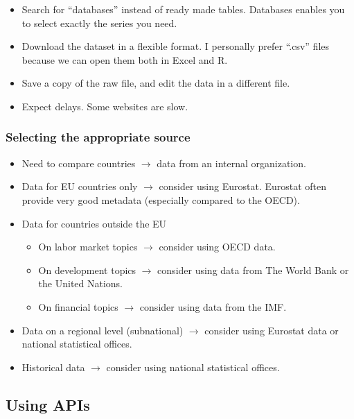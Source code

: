 \documentclass[]{book}
\providecommand{\tightlist}{%
  \setlength{\itemsep}{0pt}\setlength{\parskip}{0pt}}
\begin{document}
\begin{itemize}
\tightlist
\item
  Search for ``databases'' instead of ready made tables. Databases enables you to select exactly the series you need.
\item
  Download the dataset in a flexible format. I personally prefer ``.csv'' files because we can open them both in Excel and R.
\item
  Save a copy of the raw file, and edit the data in a different file.
\item
  Expect delays. Some websites are slow.
\end{itemize}

\hypertarget{selecting-the-appropriate-source}{%
\subsubsection{Selecting the appropriate source}\label{selecting-the-appropriate-source}}

\begin{itemize}
\item
  Need to compare countries \(\rightarrow\) data from an internal organization.
\item
  Data for EU countries only \(\rightarrow\) consider using Eurostat. Eurostat often provide very good metadata (especially compared to the OECD).
\item
  Data for countries outside the EU

  \begin{itemize}
  \tightlist
  \item
    On labor market topics \(\rightarrow\) consider using OECD data.
  \item
    On development topics \(\rightarrow\) consider using data from The World Bank or the United Nations.
  \item
    On financial topics \(\rightarrow\) consider using data from the IMF.
  \end{itemize}
\item
  Data on a regional level (subnational) \(\rightarrow\) consider using Eurostat data or national statistical offices.
\item
  Historical data \(\rightarrow\) consider using national statistical offices.
\end{itemize}

\hypertarget{using-apis}{%
\subsection{Using APIs}\label{using-apis}}
\end{document}
